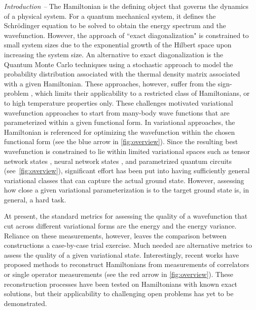 \documentclass[amsmath,amssymb,aps,prl,superscriptaddress,twocolumn,floatfix]{revtex4}
\begin{document}
{\it Introduction --} The Hamiltonian is the defining object
that governs the dynamics of a physical system. For a quantum mechanical system, 
it defines the Schr\"odinger equation to be solved to obtain the energy spectrum and the wavefunction. However, the approach of ``exact diagonalization" is constrained to small system sizes due to the exponential growth of the Hilbert space upon increasing the system size.
An alternative to exact diagonalization is the Quantum Monte Carlo techniques using a stochastic approach to model the probability distribution associated with the thermal density matrix associated with a given Hamiltonian. These approaches, however, suffer from the sign-problem \cite{PhysRevLett.94.170201}, which limits their applicability to a restricted class of Hamiltonians, or to high temperature properties only. 
These challenges motivated variational wavefunction approaches to start from many-body wave functions that are parameterized within a given functional form.
In variational approaches, the Hamiltonian is referenced for optimizing the wavefunction within the chosen functional form (see the blue arrow in \autoref{fig:overview}). Since the resulting best wavefunction is constrained to lie within limited variational spaces such as 
tensor network states \cite{doi:10.1080/14789940801912366}, neural network states \cite{Carleo602,PhysRevB.100.125124}, and parametrized quantum circuits \cite{Peruzzo_2014,McClean_2016} (see~\autoref{fig:overview}), significant effort has been put into having sufficiently general variational classes that can capture the actual ground state. However, assessing how close a given variational parameterization is to the target ground state is, in general, a hard task.


At present, the standard metrics for assessing the quality of a wavefunction that cut across different variational forms are the energy and the energy variance. Reliance on these measurements, however, leaves the comparison between constructions a case-by-case trial exercise.
Much needed are alternative metrics to assess the quality of a given variational state.
Interestingly, recent works have proposed methods to reconstruct Hamiltonians from measurements of correlators \cite{Qi2019determininglocal,PhysRevX.8.031029,PhysRevLett.122.020504,Valenti_2019} or single operator measurements \cite{Pakrouski2020automaticdesignof} (see the red arrow in  \autoref{fig:overview}).
These reconstruction processes have been tested on Hamiltonians with known exact solutions, but their applicability to challenging open problems has yet to be demonstrated.
\end{document}
